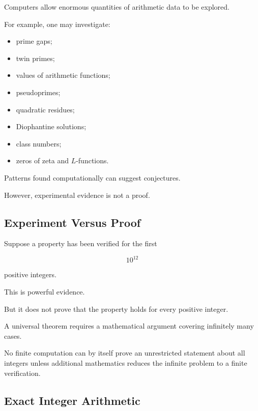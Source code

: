 Computers allow enormous quantities of arithmetic data to be explored.

For example, one may investigate:

\begin{itemize}
    \item prime gaps;
    \item twin primes;
    \item values of arithmetic functions;
    \item pseudoprimes;
    \item quadratic residues;
    \item Diophantine solutions;
    \item class numbers;
    \item zeros of zeta and \(L\)-functions.
\end{itemize}

Patterns found computationally can suggest conjectures.

However, experimental evidence is not a proof.

\subsection{Experiment Versus Proof}
\label{subsec:experiment-versus-proof}

Suppose a property has been verified for the first

\[ 10^{12} \]

positive integers.

This is powerful evidence.

But it does not prove that the property holds for every positive integer.

A universal theorem requires a mathematical argument covering infinitely many
cases.

\begin{warningbox}
No finite computation can by itself prove an unrestricted statement about
all integers unless additional mathematics reduces the infinite problem to a
finite verification.
\end{warningbox}

\subsection{Exact Integer Arithmetic}
\label{subsec:exact-integer-arithmetic}


